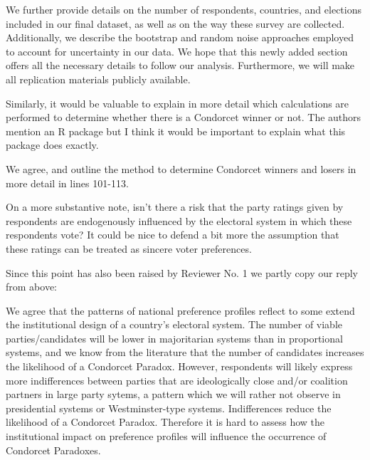 \documentclass[a4paper, 12pt]{scrartcl}
\theoremstyle{break}
\newenvironment{changes}{\par\color{violet}\par\addvspace{\baselineskip}}{\par\addvspace{\baselineskip}}
\begin{document}
We further provide details on the number of respondents, countries, and elections included in our final dataset, as well as on the way these survey are collected. Additionally, we describe the bootstrap and random noise approaches employed to account for uncertainty in our data. We hope that this newly added section offers all the necessary details to follow our analysis. Furthermore, we will make all replication materials publicly available.

\begin{changes}
	Similarly, it would be valuable to explain in more detail which calculations are performed to determine whether there is a Condorcet winner or not. The authors mention an R package but I think it would be important to explain what this package does exactly.
\end{changes}
We agree, and outline the method to determine Condorcet winners and losers in more detail in lines 101-113.

\begin{changes}
	On a more substantive note, isn’t there a risk that the party ratings given by respondents are endogenously influenced by the electoral system in which these respondents vote? It could be nice to defend a bit more the assumption that these ratings can be treated as sincere voter preferences.
\end{changes}
Since this point has also been raised by Reviewer No. 1 we partly copy our reply from above: 

We agree that the patterns of national preference profiles reflect to some extend the institutional design of a country's electoral system. The number of viable parties/candidates will be lower in majoritarian systems than in proportional systems, and we know from the literature that the number of candidates increases the likelihood of a Condorcet Paradox. However, respondents will likely express more indifferences between parties that are ideologically close and/or coalition partners in large party sytems, a pattern which we will rather not observe in presidential systems or Westminster-type systems. Indifferences reduce the likelihood of a Condorcet Paradox. Therefore it is hard to assess how the institutional impact on preference profiles will influence the occurrence of Condorcet Paradoxes. 
\end{document}
